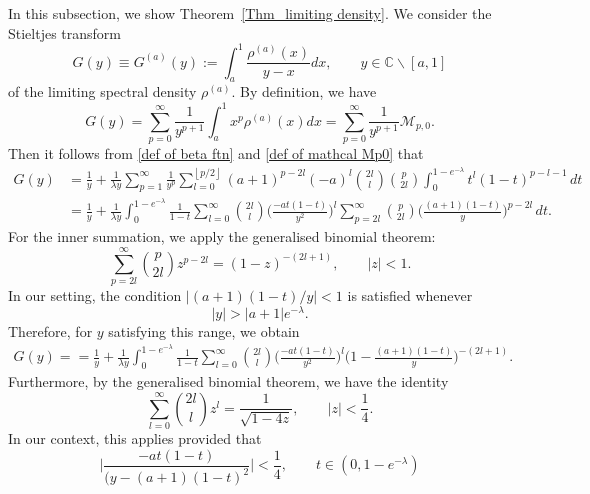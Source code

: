 \documentclass{amsart}
\def\C{\mathbb{C}}
\newcommand{\floor}[1]{\left\lfloor#1\right\rfloor}
\theoremstyle{plain}
\theoremstyle{remark}
\newcommand{\abs}[1]{\lvert#1\rvert}
\numberwithin{equation}{section}
\begin{document}
In this subsection, we show Theorem~\ref{Thm_limiting density}. 
We consider the Stieltjes transform
\begin{equation}
    G(y)\equiv G^{(a)}(y):=\int_{a}^{1} \frac{\rho^{(a)}(x)}{y-x} dx, \qquad y\in\C\backslash [a,1]
\end{equation}
of the limiting spectral density $\rho^{(a)}$. By definition, we have 
\begin{equation}
    G(y)=\sum_{p=0}^{\infty} \frac{1}{y^{p+1}}\int_{a}^{1} x^{p}{\rho^{(a)}}(x)dx=\sum_{p=0}^{\infty}\frac{1}{y^{p+1}}\mathcal{M}_{p,0}.
\end{equation}
Then it follows from \eqref{def of beta ftn} and \eqref{def of mathcal Mp0} that 
\begin{align*}
    G(y) &=\frac{1}{y}+\frac{1}{\lambda y}\sum_{p=1}^{\infty}\frac{1}{y^{p}}\sum_{l=0}^{\floor{p/2}}(a+1)^{p-2l}(-a)^{l}\binom{2l}{l}\binom{p}{2l}\int_{0}^{1-e^{-\lambda}}t^{l}(1-t)^{p-l-1}\, dt
    \\
    &=\frac{1}{y}+\frac{1}{\lambda y}
    \int_{0}^{1-e^{-\lambda}}\frac{1}{1-t}\sum_{l=0}^{\infty}\binom{2l}{l}\Big(\frac{-at(1-t)}{ y^{2}}\Big)^{l}\sum_{p=2l}^{\infty}\binom{p}{2l}\Big(\frac{(a+1)(1-t)}{y}\Big)^{p-2l}\, dt.
\end{align*}
For the inner summation, we apply the generalised binomial theorem:
\begin{equation*}
    \sum_{p=2l}^{\infty}\binom{p}{2l} z^{p-2l}= (1-z)^{-(2l+1)}, \qquad \abs{z}<1.
\end{equation*}
In our setting, the condition $| (a+1)(1-t)/y|<1$ is satisfied whenever
\begin{equation} \label{eqn:yrange0}
    \abs{y}> \abs{a+1}{e^{-\lambda}}.
\end{equation}
Therefore, for $y$ satisfying this range, we obtain
\begin{align*}
  G(y)= =\frac{1}{y}+\frac{1}{\lambda y}
    \int_{0}^{1-e^{-\lambda}}\frac{1}{1-t}\sum_{l=0}^{\infty}\binom{2l}{l}\Big(\frac{-at(1-t)}{ y^{2}}\Big)^{l} \Big(1-\frac{(a+1)(1-t)}{y}\Big)^{-(2l+1)}.  
\end{align*} 
Furthermore, by the generalised binomial theorem, we have the identity 
\begin{equation}
    \sum_{l=0}^{\infty}\binom{2l}{l}z^{l}=\frac{1}{\sqrt{1-4z}},\qquad \abs{z}<\frac14 . 
\end{equation}
In our context, this applies provided that 
\begin{equation} 
    \Big|{\frac{-at(1-t)}{(y-(a+1)(1-t)^{2}}}\Big|<\frac{1}{4}, \qquad t\in (0,1-e^{-\lambda})
\end{equation}
\end{document}
